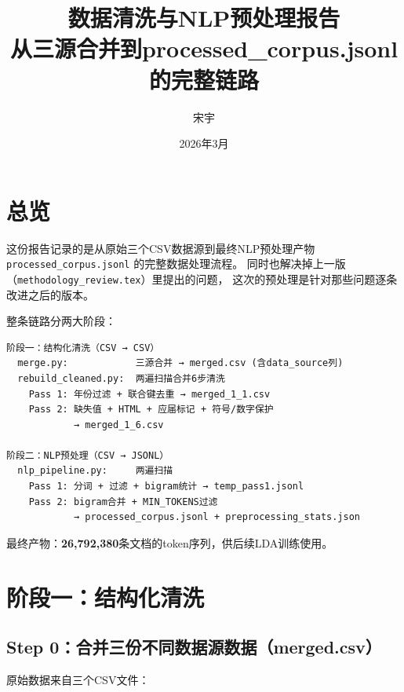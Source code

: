 \documentclass[12pt,a4paper]{ctexart}
\title{\textbf{数据清洗与NLP预处理报告}\\[0.5em]
\large 从三源合并到processed\_corpus.jsonl的完整链路}
\author{宋宇}
\date{2026年3月}
\begin{document}
\maketitle
\tableofcontents
\newpage


\section{总览}
\label{sec:overview}

这份报告记录的是从原始三个CSV数据源到最终NLP预处理产物 \texttt{processed\_corpus.jsonl} 的完整数据处理流程。
同时也解决掉上一版（\texttt{methodology\_review.tex}）里提出的问题，
这次的预处理是针对那些问题逐条改进之后的版本。

整条链路分两大阶段：

\begin{verbatim}
阶段一：结构化清洗（CSV → CSV）
  merge.py:            三源合并 → merged.csv (含data_source列)
  rebuild_cleaned.py:  两遍扫描合并6步清洗
    Pass 1: 年份过滤 + 联合键去重 → merged_1_1.csv
    Pass 2: 缺失值 + HTML + 应届标记 + 符号/数字保护
            → merged_1_6.csv

阶段二：NLP预处理（CSV → JSONL）
  nlp_pipeline.py:     两遍扫描
    Pass 1: 分词 + 过滤 + bigram统计 → temp_pass1.jsonl
    Pass 2: bigram合并 + MIN_TOKENS过滤
            → processed_corpus.jsonl + preprocessing_stats.json
\end{verbatim}

最终产物：\textbf{26,792,380}条文档的token序列，供后续LDA训练使用。


\section{阶段一：结构化清洗}
\label{sec:structural}

\subsection{Step 0：合并三份不同数据源数据（merged.csv）}

原始数据来自三个CSV文件：
\end{document}
